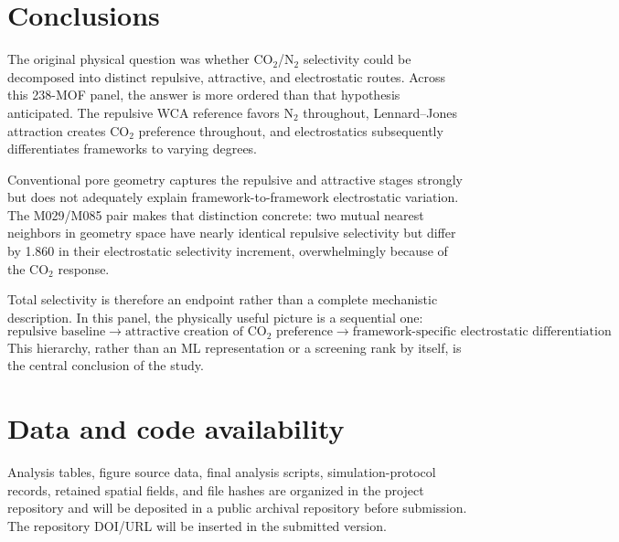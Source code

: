\documentclass[11pt,a4paper]{article}
\begin{document}
\section{Conclusions}

The original physical question was whether CO$_2$/N$_2$ selectivity could be decomposed into distinct repulsive, attractive, and electrostatic routes. Across this 238-MOF panel, the answer is more ordered than that hypothesis anticipated. The repulsive WCA reference favors N$_2$ throughout, Lennard--Jones attraction creates CO$_2$ preference throughout, and electrostatics subsequently differentiates frameworks to varying degrees.

Conventional pore geometry captures the repulsive and attractive stages strongly but does not adequately explain framework-to-framework electrostatic variation. The M029/M085 pair makes that distinction concrete: two mutual nearest neighbors in geometry space have nearly identical repulsive selectivity but differ by 1.860 in their electrostatic selectivity increment, overwhelmingly because of the CO$_2$ response.

Total selectivity is therefore an endpoint rather than a complete mechanistic description. In this panel, the physically useful picture is a sequential one:
\[
\boxed{
\text{repulsive baseline}
\rightarrow
\text{attractive creation of CO$_2$ preference}
\rightarrow
\text{framework-specific electrostatic differentiation}
}
\]
This hierarchy, rather than an ML representation or a screening rank by itself, is the central conclusion of the study.

\section*{Data and code availability}

Analysis tables, figure source data, final analysis scripts, simulation-protocol records, retained spatial fields, and file hashes are organized in the project repository and will be deposited in a public archival repository before submission. The repository DOI/URL will be inserted in the submitted version.



\end{document}
